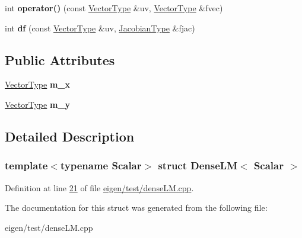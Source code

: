 \begin{DoxyCompactItemize}
\item 
\mbox{\label{struct_dense_l_m_a3aa5ba22b1ee82c0a94514223ef03d36}} 
int {\bfseries operator()} (const \hyperlink{group___core___module}{Vector\+Type} \&uv, \hyperlink{group___core___module}{Vector\+Type} \&fvec)
\item 
\mbox{\label{struct_dense_l_m_a73b1a304a40e5b675857afd929c793b1}} 
int {\bfseries df} (const \hyperlink{group___core___module}{Vector\+Type} \&uv, \hyperlink{group___core___module_class_eigen_1_1_matrix}{Jacobian\+Type} \&fjac)
\end{DoxyCompactItemize}
\subsection*{Public Attributes}
\begin{DoxyCompactItemize}
\item 
\mbox{\label{struct_dense_l_m_a67846bbbca91e8690992dd938c5f694e}} 
\hyperlink{group___core___module}{Vector\+Type} {\bfseries m\+\_\+x}
\item 
\mbox{\label{struct_dense_l_m_ae5b34c7f83a129948c476e7e326a5579}} 
\hyperlink{group___core___module}{Vector\+Type} {\bfseries m\+\_\+y}
\end{DoxyCompactItemize}


\subsection{Detailed Description}
\subsubsection*{template$<$typename Scalar$>$\newline
struct Dense\+L\+M$<$ Scalar $>$}



Definition at line \hyperlink{eigen_2test_2dense_l_m_8cpp_source_l00021}{21} of file \hyperlink{eigen_2test_2dense_l_m_8cpp_source}{eigen/test/dense\+L\+M.\+cpp}.



The documentation for this struct was generated from the following file\+:\begin{DoxyCompactItemize}
\item 
eigen/test/dense\+L\+M.\+cpp\end{DoxyCompactItemize}
